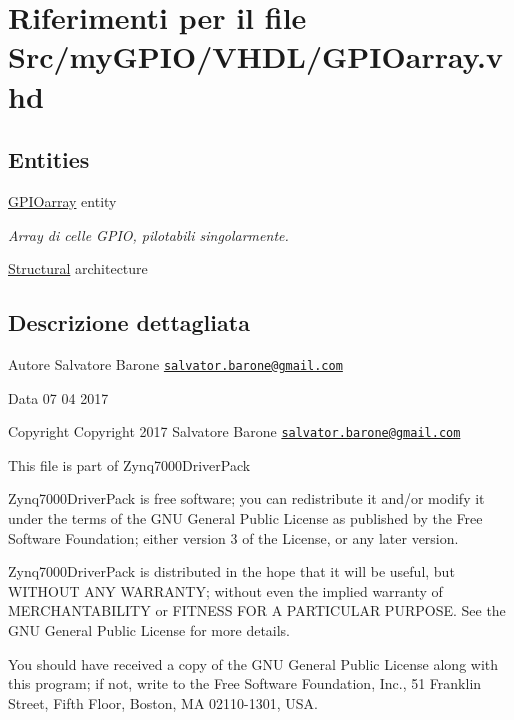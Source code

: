 \hypertarget{_g_p_i_oarray_8vhd}{\section{Riferimenti per il file Src/my\+G\+P\+I\+O/\+V\+H\+D\+L/\+G\+P\+I\+Oarray.vhd}
\label{_g_p_i_oarray_8vhd}
}
\subsection*{Entities}
\begin{DoxyCompactItemize}
\item 
\hyperlink{class_g_p_i_oarray}{G\+P\+I\+Oarray} entity
\begin{DoxyCompactList}\small\item\em Array di celle G\+P\+I\+O, pilotabili singolarmente. \end{DoxyCompactList}\item 
\hyperlink{class_g_p_i_oarray_1_1_structural}{Structural} architecture
\end{DoxyCompactItemize}


\subsection{Descrizione dettagliata}
\begin{DoxyAuthor}{Autore}
Salvatore Barone \href{mailto:salvator.barone@gmail.com}{\tt salvator.\+barone@gmail.\+com} 
\end{DoxyAuthor}
\begin{DoxyDate}{Data}
07 04 2017
\end{DoxyDate}
\begin{DoxyCopyright}{Copyright}
Copyright 2017 Salvatore Barone \href{mailto:salvator.barone@gmail.com}{\tt salvator.\+barone@gmail.\+com}
\end{DoxyCopyright}
This file is part of Zynq7000\+Driver\+Pack

Zynq7000\+Driver\+Pack is free software; you can redistribute it and/or modify it under the terms of the G\+N\+U General Public License as published by the Free Software Foundation; either version 3 of the License, or any later version.

Zynq7000\+Driver\+Pack is distributed in the hope that it will be useful, but W\+I\+T\+H\+O\+U\+T A\+N\+Y W\+A\+R\+R\+A\+N\+T\+Y; without even the implied warranty of M\+E\+R\+C\+H\+A\+N\+T\+A\+B\+I\+L\+I\+T\+Y or F\+I\+T\+N\+E\+S\+S F\+O\+R A P\+A\+R\+T\+I\+C\+U\+L\+A\+R P\+U\+R\+P\+O\+S\+E. See the G\+N\+U General Public License for more details.

You should have received a copy of the G\+N\+U General Public License along with this program; if not, write to the Free Software Foundation, Inc., 51 Franklin Street, Fifth Floor, Boston, M\+A 02110-\/1301, U\+S\+A. 